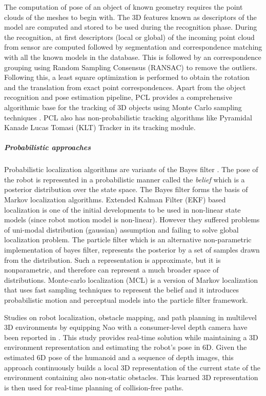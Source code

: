 The computation of pose of an object of known geometry requires the point clouds of the meshes to begin with. The 3D features known as descriptors of the model are computed and stored to be used during the recognition phase.  During the recognition, at first descriptors (local or global) of the incoming point cloud from sensor are computed followed by segmentation and correspondence matching with all the known models in the database. This is followed by an correspondence grouping using Random Sampling Consensus (RANSAC) to remove the outliers. Following this, a least square optimization is performed to obtain the rotation and the translation from exact point correspondences. Apart from the object recognition and pose estimation pipeline, PCL provides a comprehensive algorithmic base for the tracking of 3D objects using Monte Carlo sampling techniques \cite{RUeda2012}. PCL also has non-probabilistic tracking algorithms like Pyramidal Kanade Lucas Tomasi (KLT) Tracker in its tracking module.
\subparagraph{Probabilistic approaches}
\label{ssec:prob_approaches}
Probabilistic localization algorithms are variants of the Bayes filter \cite{thrun2005probabilistic}. The pose of the robot is represented in a probabilistic manner called the \emph{belief} which is a posterior distribution over the state space. The Bayes filter \cite{thrun2005probabilistic} forms the basis of Markov localization algorithms. Extended Kalman Filter (EKF) based localization is one of the initial developments to be used in non-linear state models (since robot motion model is non-linear). However they suffered problems of uni-modal distribution (gaussian) assumption and failing to solve global localization problem. The particle filter \cite{thrun2005probabilistic} which is an alternative non-parametric implementation of bayes filter, represents the posterior by a set of samples drawn from the distribution. Such a representation is approximate, but it is nonparametric, and therefore can represent a much broader space of distributions. Monte-carlo localization (MCL) \cite{fox1999monte} is a version of Markov localization that uses fast sampling techniques to represent the belief and it introduces probabilistic motion and perceptual models into the particle filter framework.
	
Studies on robot localization, obstacle mapping, and path planning in multilevel 3D environments by equipping Nao with a consumer-level depth camera have been reported in \cite{maier2012real}. This study provides real-time solution while maintaining a 3D environment representation and estimating the robot’s pose in 6D. Given the estimated 6D pose of the humanoid and a sequence of depth images, this approach continuously builds a local 3D representation of the current state of the environment containing also non-static obstacles. This learned 3D representation is then used for real-time planning of collision-free paths. 
	
